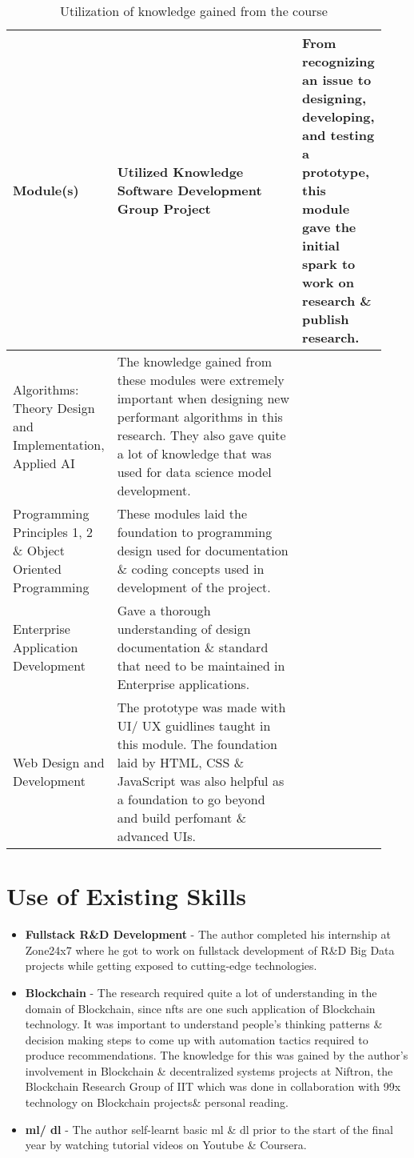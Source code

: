 \vspace{-4mm}
\begin{longtable}{|p{0.25\linewidth}|p{0.68\linewidth}|}
\caption{Utilization of knowledge gained from the course}\\ 
\hline
\textbf{Module(s)} & \textbf{Utilized Knowledge}\endfirsthead 
\hline
Software Development Group Project & From recognizing an issue to designing, developing, and testing a prototype, this module gave the initial spark to work on research \& publish research. \\
\hline
Algorithms: Theory Design and Implementation, Applied AI & The knowledge gained from these modules were extremely important when designing new performant algorithms in this research. They also gave quite a lot of knowledge that was used for data science model development. \\
\hline
Programming Principles 1, 2 \& Object Oriented Programming & These modules laid the foundation to programming design used for documentation \& coding concepts used in development of the project. \\
\hline
Enterprise Application Development & Gave a thorough understanding of design documentation \& standard that need to be maintained in Enterprise applications. \\
\hline
Web Design and Development & The prototype was made with UI/ UX guidlines taught in this module. The foundation laid by HTML, CSS \& JavaScript was also helpful as a foundation to go beyond and build perfomant \& advanced UIs. \\
\hline
\end{longtable}


\section{Use of Existing Skills}
\begin{itemize}
\item \textbf{Fullstack R\&D Development} - The author completed his internship at Zone24x7 where he got to work on fullstack development of R\&D Big Data projects while getting exposed to cutting-edge technologies.
\item \textbf{Blockchain} - The research required quite a lot of understanding in the domain of Blockchain, since \gls{nft}s are one such application of Blockchain technology. It was important to understand people's thinking patterns \& decision making steps to come up with automation tactics required to produce recommendations. The knowledge for this was gained by the author's involvement in Blockchain \& decentralized systems projects at Niftron, the Blockchain Research Group of IIT which was done in collaboration with 99x technology on Blockchain projects\& personal reading.
\item \textbf{\gls{ml}/ \gls{dl}} - The author self-learnt basic \gls{ml} \& \gls{dl} prior to the start of the final year by watching tutorial videos on Youtube \& Coursera.
\end{itemize}


